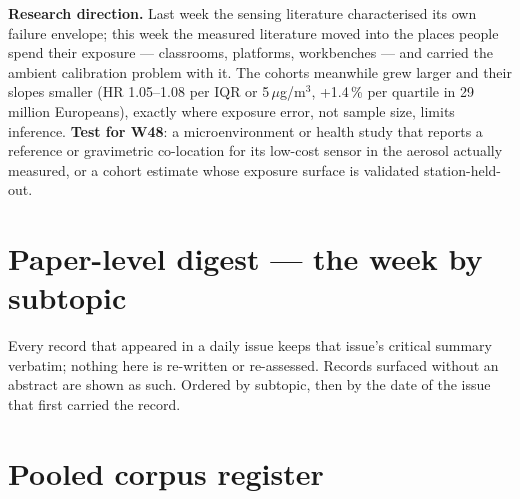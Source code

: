 \documentclass[10pt]{article}
\begin{document}
\vspace{1.5mm}
\textbf{Research direction.} Last week the sensing literature characterised its own failure envelope; this week
the measured literature moved into the places people spend their exposure --- classrooms, platforms, workbenches ---
and carried the ambient calibration problem with it. The cohorts meanwhile grew larger and their slopes smaller
(HR 1.05--1.08 per IQR or 5\,$\mu$g/m$^3$, +1.4\,\% per quartile in 29 million Europeans), exactly where exposure
error, not sample size, limits inference. \textbf{Test for W48}: a microenvironment or health study that reports a
reference or gravimetric co-location for its low-cost sensor in the aerosol actually measured, or a cohort estimate
whose exposure surface is validated station-held-out.

\clearpage

\section*{\sffamily\bfseries\color{Deep}Paper-level digest --- the week by subtopic}
\vspace{-1.5mm}{\color{Teal}\rule{\linewidth}{1.1pt}}\vspace{1mm}

{\fontsize{7.4}{9}\selectfont\color{Slate}Every record that appeared in a daily issue
keeps that issue's critical summary verbatim; nothing here is re-written or re-assessed.
Records surfaced without an abstract are shown as such. Ordered by subtopic, then by the
date of the issue that first carried the record.\par}



\section*{\sffamily\bfseries\color{Deep}Pooled corpus register}
\vspace{-1.5mm}{\color{Teal}\rule{\linewidth}{1.1pt}}\vspace{2.5mm}


\end{document}
